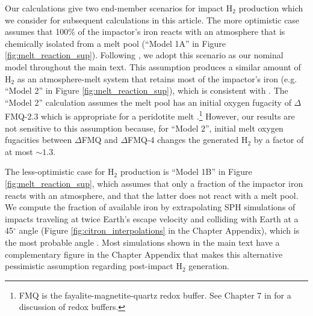 Our calculations give two end-member scenarios for impact H$_2$ production which we consider for subsequent calculations in this article. The more optimistic case assumes that 100\% of the impactor's iron reacts with an atmosphere that is chemically isolated from a melt pool (``Model 1A'' in Figure \ref{fig:melt_reaction_sup}). Following \citet{Zahnle_2020}, we adopt this scenario as our nominal model throughout the main text. This assumption produces a similar amount of H$_2$ as an atmosphere-melt system that retains most of the impactor's iron (e.g. ``Model 2'' in Figure \ref{fig:melt_reaction_sup}), which is consistent with \citet{Itcovitz_2022}. The ``Model 2'' calculation assumes the melt pool has an initial oxygen fugacity of $\Delta$FMQ-2.3 which is appropriate for a peridotite melt \citep{Itcovitz_2022}.\footnote{FMQ is the fayalite-magnetite-quartz redox buffer. See Chapter 7 in \citet{Catling_2017} for a discussion of redox buffers.} However, our results are not sensitive to this assumption because, for ``Model 2'', initial melt oxygen fugacities between $\Delta$FMQ and $\Delta$FMQ-4 changes the generated H$_2$ by a factor of at most $\sim 1.3$.

The less-optimistic case for H$_2$ production is ``Model 1B'' in Figure \ref{fig:melt_reaction_sup}, which assumes that only a fraction of the impactor iron reacts with an atmosphere, and that the latter does not react with a melt pool. We compute the fraction of available iron by extrapolating SPH simulations of impacts traveling at twice Earth's escape velocity and colliding with Earth at a 45$^{\circ}$ angle (Figure \ref{fig:citron_interpolations} in the Chapter Appendix), which is the most probable angle \citep{Citron_2022}. Most simulations shown in the main text have a complementary figure in the Chapter Appendix that makes this alternative pessimistic assumption regarding post-impact H$_2$ generation.

